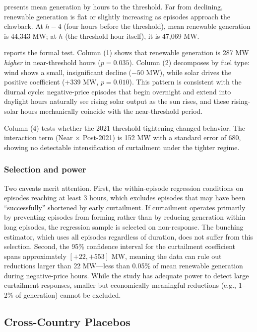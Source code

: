 \documentclass[12pt]{article}
\begin{document}
 presents mean generation by hours to the threshold. Far from declining, renewable generation is flat or slightly increasing as episodes approach the clawback. At $h - 4$ (four hours before the threshold), mean renewable generation is 44,343 MW; at $h$ (the threshold hour itself), it is 47,069 MW.

 reports the formal test. Column (1) shows that renewable generation is 287 MW \emph{higher} in near-threshold hours ($p = 0.035$). Column (2) decomposes by fuel type: wind shows a small, insignificant decline ($-50$ MW), while solar drives the positive coefficient (+339 MW, $p = 0.010$). This pattern is consistent with the diurnal cycle: negative-price episodes that begin overnight and extend into daylight hours naturally see rising solar output as the sun rises, and these rising-solar hours mechanically coincide with the near-threshold period.

Column (4) tests whether the 2021 threshold tightening changed behavior. The interaction term (Near $\times$ Post-2021) is 152 MW with a standard error of 680, showing no detectable intensification of curtailment under the tighter regime.

\subsubsection*{Selection and power} Two caveats merit attention. First, the within-episode regression conditions on episodes reaching at least 3 hours, which excludes episodes that may have been ``successfully'' shortened by early curtailment. If curtailment operates primarily by preventing episodes from forming rather than by reducing generation within long episodes, the regression sample is selected on non-response. The bunching estimator, which uses all episodes regardless of duration, does not suffer from this selection. Second, the 95\% confidence interval for the curtailment coefficient spans approximately $[+22, +553]$ MW, meaning the data can rule out reductions larger than 22 MW---less than 0.05\% of mean renewable generation during negative-price hours. While the study has adequate power to detect large curtailment responses, smaller but economically meaningful reductions (e.g., 1--2\% of generation) cannot be excluded.




\subsection{Cross-Country Placebos}
\end{document}
